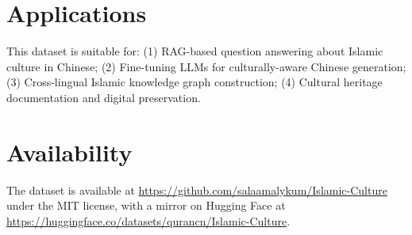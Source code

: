 \documentclass[10pt]{article}
\begin{document}
\section{Applications}
This dataset is suitable for: (1) RAG-based question answering about Islamic culture in Chinese; (2) Fine-tuning LLMs for culturally-aware Chinese generation; (3) Cross-lingual Islamic knowledge graph construction; (4) Cultural heritage documentation and digital preservation.

\section{Availability}
The dataset is available at \url{https://github.com/salaamalykum/Islamic-Culture} under the MIT license, with a mirror on Hugging Face at \url{https://huggingface.co/datasets/qurancn/Islamic-Culture}.
\end{document}
